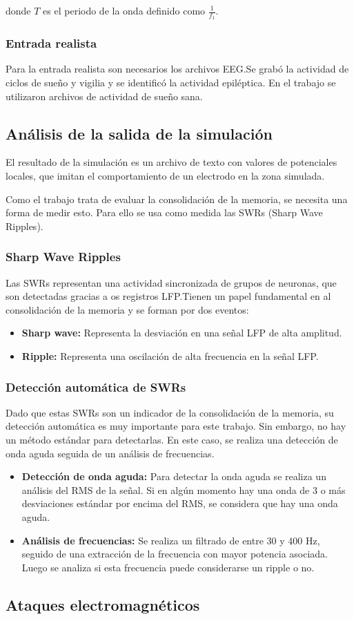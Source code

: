 \documentclass[12pt, letterpaper]{article}
\begin{document}
donde $T$ es el periodo de la onda definido como $\frac{1}{f_1}$. 

\subsubsection{Entrada realista}
Para la entrada realista son necesarios los archivos EEG.\@ Se grabó la actividad de ciclos de sueño y vigilia y se identificó la actividad epiléptica. En el trabajo se utilizaron archivos de actividad de sueño sana.

\subsection{Análisis de la salida de la simulación}
El resultado de la simulación es un archivo de texto con valores de potenciales locales, que imitan el comportamiento de un electrodo en la zona simulada. 

Como el trabajo trata de evaluar la consolidación de la memoria, se necesita una forma de medir esto. Para ello se usa como medida las SWRs (Sharp Wave Ripples).

\subsubsection{Sharp Wave Ripples}
Las SWRs representan una actividad sincronizada de grupos de neuronas, que son detectadas gracias a os registros LFP.\@ Tienen un papel fundamental en al consolidación de la memoria y se forman por dos eventos:
\begin{itemize}
    \item \textbf{Sharp wave:} Representa la desviación en una señal LFP de alta amplitud.
    \item \textbf{Ripple:} Representa una oscilación de alta frecuencia en la señal LFP.\@
\end{itemize}

\subsubsection{Detección automática de SWRs}
Dado que estas SWRs son un indicador de la consolidación de la memoria, su detección automática es muy importante para este trabajo. Sin embargo, no hay un método estándar para detectarlas. En este caso, se realiza una detección de onda aguda seguida de un análisis de frecuencias.

\begin{itemize}
    \item \textbf{Detección de onda aguda:} Para detectar la onda aguda se realiza un análisis del RMS de la señal. Si en algún momento hay una onda de 3 o más desviaciones estándar por encima del RMS, se considera que hay una onda aguda.
    \item \textbf{Análisis de frecuencias:} Se realiza un filtrado de entre 30 y 400 Hz, seguido de una extracción de la frecuencia con mayor potencia asociada. Luego se analiza si esta frecuencia puede considerarse un ripple o no.
\end{itemize}

\subsection{Ataques electromagnéticos}
\end{document}
